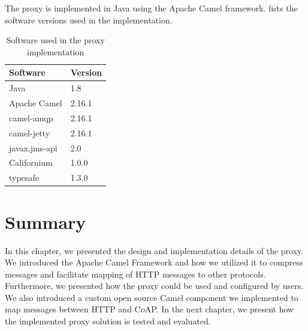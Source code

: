 The proxy is implemented in Java using the Apache Camel framework.
 lists the software versions used in the
implementation.

\begin{table}[h]
\begin{tabularx}{0.5\textwidth}{|X|X|}
\hline
\textbf{Software} & \textbf{Version} \\ \hline
Java            & 1.8           \\ \hline
Apache Camel     & 2.16.1           \\ \hline
camel-amqp      & 2.16.1            \\ \hline
camel-jetty      & 2.16.1            \\ \hline
javax.jms-api      & 2.0            \\ \hline
Californium      & 1.0.0            \\ \hline
typesafe      & 1.3.0            \\ \hline
\end{tabularx}
\caption{Software used in the proxy implementation}
\label{table:implementation-versions}
\end{table}

\section{Summary}

In this chapter, we presented the design and implementation details of the
proxy. We introduced the Apache Camel Framework and how we utilized it to
compress messages and facilitate mapping of HTTP messages to other protocols.
Furthermore, we presented how the proxy could be used and configured by users.
We also introduced a custom open source Camel component we implemented to map
messages between HTTP and CoAP. In the next chapter, we present how the
implemented proxy solution is tested and evaluated.
